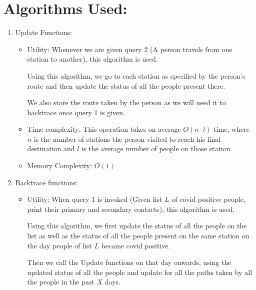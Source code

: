 \documentclass{article}
\begin{document}
\newpage
\section{Algorithms Used:}
\begin{enumerate}
    \item Update Functions: {\begin{itemize}
        \item Utility:
		Whenever we are given query 2 (A person travels from one station to another), this algorithm is used.
		
		Using this algorithm, we go to each station as specified by the person's route and then update the status of all the people present there.
		
		We also store the route taken by the person as we will need it to backtrace once query 1 is given.
		\item Time complexity:
		This operation takes on average $O(n\cdot l)$ time, where $n$ is the number of stations the person visited to reach his final destination and $l$ is the average number of people on those station.
		\item Memory Complexity: $O(1)$
    \end{itemize}
	}
	\item Backtrace functions: {\begin{itemize}
        \item Utility:
		When query 1 is invoked (Given list $L$ of covid positive people, print their primary and secondary contacts), this algorithm is used.
		
		Using this algorithm, we first update the status of all the people on the list as well as the status of all the people present on the same station on the day people of list $L$ became covid positive.
		
		Then we call the Update functions on that day onwards, using the updated status of all the people and update for all the paths taken by all the people in the past $X$ days.
		

\end{itemize}}
\end{enumerate}
\end{document}

